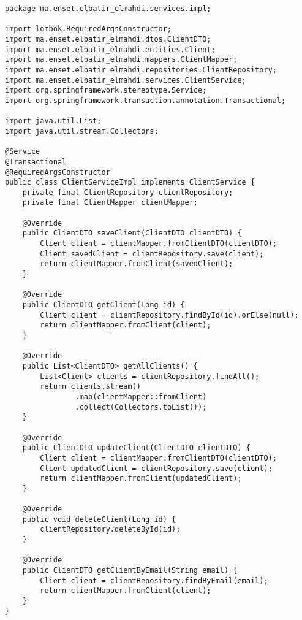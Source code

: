 \begin{lstlisting}[caption=Implémentation du Service Client]
package ma.enset.elbatir_elmahdi.services.impl;

import lombok.RequiredArgsConstructor;
import ma.enset.elbatir_elmahdi.dtos.ClientDTO;
import ma.enset.elbatir_elmahdi.entities.Client;
import ma.enset.elbatir_elmahdi.mappers.ClientMapper;
import ma.enset.elbatir_elmahdi.repositories.ClientRepository;
import ma.enset.elbatir_elmahdi.services.ClientService;
import org.springframework.stereotype.Service;
import org.springframework.transaction.annotation.Transactional;

import java.util.List;
import java.util.stream.Collectors;

@Service
@Transactional
@RequiredArgsConstructor
public class ClientServiceImpl implements ClientService {
    private final ClientRepository clientRepository;
    private final ClientMapper clientMapper;

    @Override
    public ClientDTO saveClient(ClientDTO clientDTO) {
        Client client = clientMapper.fromClientDTO(clientDTO);
        Client savedClient = clientRepository.save(client);
        return clientMapper.fromClient(savedClient);
    }

    @Override
    public ClientDTO getClient(Long id) {
        Client client = clientRepository.findById(id).orElse(null);
        return clientMapper.fromClient(client);
    }

    @Override
    public List<ClientDTO> getAllClients() {
        List<Client> clients = clientRepository.findAll();
        return clients.stream()
                .map(clientMapper::fromClient)
                .collect(Collectors.toList());
    }

    @Override
    public ClientDTO updateClient(ClientDTO clientDTO) {
        Client client = clientMapper.fromClientDTO(clientDTO);
        Client updatedClient = clientRepository.save(client);
        return clientMapper.fromClient(updatedClient);
    }

    @Override
    public void deleteClient(Long id) {
        clientRepository.deleteById(id);
    }

    @Override
    public ClientDTO getClientByEmail(String email) {
        Client client = clientRepository.findByEmail(email);
        return clientMapper.fromClient(client);
    }
}
\end{lstlisting}